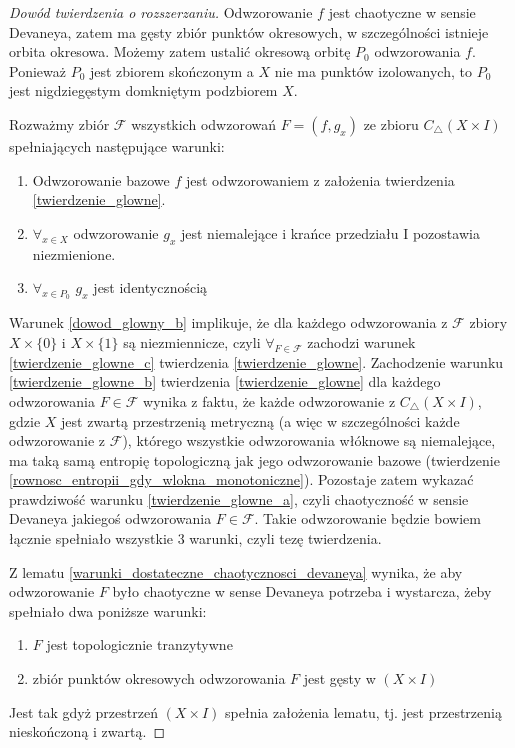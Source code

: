 \documentclass[licencjacka]{pwr_wmat_praca_dyplomowa}
\theoremstyle{plain}
\numberwithin{theorem}{chapter}
\theoremstyle{definition}
\numberwithin{theorem}{chapter}
\begin{document}
\begin{proof}[Dowód twierdzenia o rozszerzaniu]
Odwzorowanie $f$ jest chaotyczne w sensie Devaneya, zatem ma gęsty zbiór punktów okresowych, w szczególności istnieje orbita okresowa.
Możemy zatem ustalić okresową orbitę $P_0$ odwzorowania $f$. Ponieważ $P_0$ jest zbiorem skończonym a $X$ nie ma punktów izolowanych, to $P_0$ jest nigdziegęstym domkniętym podzbiorem $X$.

Rozważmy zbiór $\mathcal{F}$ wszystkich odwzorowań $F = (f, g_x)$ ze zbioru $C_\triangle(X \times I)$ spełniających następujące warunki:
\begin{enumerate}
\item\label{dowod_glowny_a} Odwzorowanie bazowe $f$ jest odwzorowaniem z założenia twierdzenia \ref{twierdzenie_glowne}.
\item\label{dowod_glowny_b} $\forall_{x \in X}$ odwzorowanie $g_x$ jest niemalejące i krańce przedziału I pozostawia niezmienione.
\item\label{dowod_glowny_c} $\forall_{x \in P_0}$ $g_x$ jest identycznością 
\end{enumerate}

Warunek \ref{dowod_glowny_b} implikuje, że dla każdego odwzorowania z $\mathcal{F}$ zbiory $X \times \{0\}$ i $X \times \{1\}$ są niezmiennicze, czyli $\forall_{F \in \mathcal{F}}$ zachodzi warunek \ref{twierdzenie_glowne_c}  twierdzenia \ref{twierdzenie_glowne}. Zachodzenie warunku \ref{twierdzenie_glowne_b} twierdzenia \ref{twierdzenie_glowne} dla każdego odwzorowania $F \in \mathcal{F}$ wynika z faktu, że każde odwzorowanie z $C_\triangle(X \times I)$, gdzie $X$ jest zwartą przestrzenią metryczną (a więc w szczególności każde odwzorowanie z $\mathcal{F}$), którego wszystkie odwzorowania włóknowe są niemalejące, ma taką samą entropię topologiczną jak jego odwzorowanie bazowe (twierdzenie \ref{rownosc_entropii_gdy_wlokna_monotoniczne}).
Pozostaje zatem wykazać prawdziwość warunku \ref{twierdzenie_glowne_a}, czyli chaotyczność w sensie Devaneya jakiegoś odwzorowania $F \in \mathcal{F}$. Takie odwzorowanie będzie bowiem łącznie spełniało wszystkie 3 warunki, czyli tezę twierdzenia.

Z lematu \ref{warunki_dostateczne_chaotycznosci_devaneya} wynika, że aby odwzorowanie $F$ było chaotyczne w sense Devaneya potrzeba i wystarcza, żeby spełniało dwa poniższe warunki:
\begin{enumerate}
\item \label{devaney_pierwsza_wlasnosc} $F$ jest topologicznie tranzytywne
\item \label{devaney_druga_wlasnosc} zbiór punktów okresowych odwzorowania $F$ jest gęsty w $(X \times I)$
\end{enumerate}
Jest tak gdyż przestrzeń $(X \times I)$ spełnia założenia lematu, tj. jest przestrzenią nieskończoną i zwartą.


\end{proof}
\end{document}
